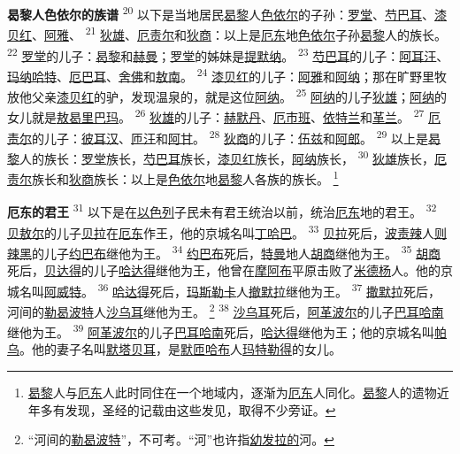 \textbf{曷黎人色依尔的族谱 }
\textsuperscript{20}
以下是当地居民\uline{曷黎}人\uline{色依尔}的子孙：\uline{罗堂}、\uline{芍巴耳}、\uline{漆贝红}、\uline{阿雅}、
\textsuperscript{21}
\uline{狄雄}、\uline{厄责尔}和\uline{狄商}：以上是\uline{厄东}地\uline{色依尔}子孙\uline{曷黎}人的族长。
\textsuperscript{22}
\uline{罗堂}的儿子：\uline{曷黎}和\uline{赫曼}；\uline{罗堂}的姊妹是\uline{提默纳}。
\textsuperscript{23}
\uline{芍巴耳}的儿子：\uline{阿耳汪}、\uline{玛纳哈特}、\uline{厄巴耳}、\uline{舍佛}和\uline{敖南}。
\textsuperscript{24}
\uline{漆贝红}的儿子：\uline{阿雅}和\uline{阿纳}；那在旷野里牧放他父亲\uline{漆贝红}的驴，发现温泉的，就是这位\uline{阿纳}。
\textsuperscript{25}
\uline{阿纳}的儿子\uline{狄雄}；\uline{阿纳}的女儿就是\uline{敖曷里}\uline{巴玛}。
\textsuperscript{26}
\uline{狄雄}的儿子：\uline{赫默丹}、\uline{厄市班}、\uline{依特兰}和\uline{革兰}。
\textsuperscript{27}
\uline{厄责尔}的儿子：\uline{彼耳汉}、\uline{匝汪}和\uline{阿甘}。
\textsuperscript{28}
\uline{狄商}的儿子：\uline{伍兹}和\uline{阿郎}。
\textsuperscript{29}
以上是\uline{曷黎}人的族长：\uline{罗堂}族长，\uline{芍巴耳}族长，\uline{漆贝红}族长，\uline{阿纳}族长，
\textsuperscript{30}
\uline{狄雄}族长，\uline{厄责尔}族长和\uline{狄商}族长：以上是\uline{色依尔}地\uline{曷黎}人各族的族长。
\footnote{\uline{曷黎}人与\uline{厄东}人此时同住在一个地域内，逐渐为\uline{厄东}人同化。\uline{曷黎}人的遗物近年多有发现，圣经的记载由这些发见，取得不少旁证。}

\textbf{厄东的君王 }
\textsuperscript{31}
以下是在\uline{以色列}子民未有君王统治以前，统治\uline{厄东}地的君王。
\textsuperscript{32}
\uline{贝敖尔}的儿子\uline{贝拉}在\uline{厄东}作王，他的京城名叫\uline{丁哈巴}。
\textsuperscript{33}
\uline{贝拉}死后，\uline{波责辣}人\uline{则辣黑}的儿子\uline{约巴布}继他为王。
\textsuperscript{34}
\uline{约巴布}死后，\uline{特曼}地人\uline{胡商}继他为王。
\textsuperscript{35}
\uline{胡商}死后，\uline{贝达得}的儿子\uline{哈达得}继他为王，他曾在\uline{摩阿布}平原击败了\uline{米德杨}人。他的京城名叫\uline{阿威特}。
\textsuperscript{36}
\uline{哈达得}死后，\uline{玛斯}\uline{勒卡}人\uline{撤默拉}继他为王。
\textsuperscript{37}
\uline{撒默拉}死后，河间的\uline{勒曷波特}人\uline{沙乌耳}继他为王。
\footnote{“河间的\uline{勒曷波特}”，不可考。“河”也许指\uline{幼发拉的}河。}
\textsuperscript{38}
\uline{沙乌耳}死后，\uline{阿革}\uline{波尔}的儿子\uline{巴耳}\uline{哈南}继他为王。
\textsuperscript{39}
\uline{阿革}\uline{波尔}的儿子\uline{巴耳}\uline{哈南}死后，\uline{哈达得}继他为王；他的京城名叫\uline{帕乌}。他的妻子名叫\uline{默塔贝耳}，是\uline{默匝}\uline{哈布}人\uline{玛特}\uline{勒得}的女儿。

